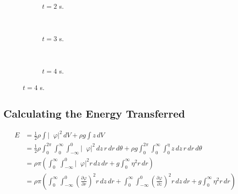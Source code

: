 \documentclass[12pt]{article}
\DeclareMathOperator{\grad}{\overset{\rightharpoonup}\nabla}
\begin{document}
\begin{figure}[p] \ContinuedFloat
\begin{centering}
 \begin{subfigure}{\textwidth}
  
  \caption{$t=2$ s.}
 \end{subfigure} \\
 \begin{subfigure}{\textwidth}
  
  \caption{$t=3$ s.}
 \end{subfigure} \\
  \begin{subfigure}{\textwidth}
  
  \caption{$t=4$ s.}
 \end{subfigure}
 \end{centering}
\end{figure}

\subsection{Calculating the Energy Transferred}
\label{chap:energy}

\begin{align*}
E &= \frac{1}{2} \rho \int \left| \grad \varphi \right|^2 \, dV + \rho g \int z \, dV \\
&= \frac{1}{2} \rho \int_0^{2\pi} \int_0^\infty \int_{-\infty}^0 \left| \grad \varphi \right|^2 \, dz \, r \, dr \, d\theta + \rho g \int_0^{2\pi} \int_0^\infty \int_0^\eta z \, dz \, r \, dr \, d\theta \\
&= \rho \pi \left( \int_0^\infty \int_{-\infty}^0 \left| \grad \varphi \right|^2 r \, dz \, dr + g \int_0^\infty \eta^2 r \, dr \right) \\
&= \rho \pi \left( \int_0^\infty \int_{-\infty}^0 \left( \frac{\partial \varphi}{\partial r} \right)^2 r \, dz \, dr + \int_0^\infty \int_{-\infty}^0 \left( \frac{\partial \varphi}{\partial z} \right)^2 r \, dz \, dr + g \int_0^\infty \eta^2 r \, dr \right)
\end{align*}
\end{document}
